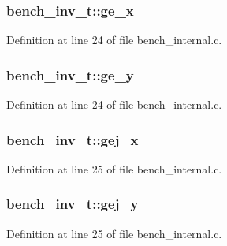 \subsubsection[{ge\+\_\+x}]{ bench\+\_\+inv\+\_\+t\+::ge\+\_\+x}\label{structbench__inv__t_a61098b92fed00ae0f9f28707a9651f1d}


Definition at line 24 of file bench\+\_\+internal.\+c.

\hypertarget{structbench__inv__t_a0ff79efc25c6a6157bfe32eb51e231a3}{}
\subsubsection[{ge\+\_\+y}]{ bench\+\_\+inv\+\_\+t\+::ge\+\_\+y}\label{structbench__inv__t_a0ff79efc25c6a6157bfe32eb51e231a3}


Definition at line 24 of file bench\+\_\+internal.\+c.

\hypertarget{structbench__inv__t_ad800b15a5597e319593b9b5dc216c3e7}{}
\subsubsection[{gej\+\_\+x}]{ bench\+\_\+inv\+\_\+t\+::gej\+\_\+x}\label{structbench__inv__t_ad800b15a5597e319593b9b5dc216c3e7}


Definition at line 25 of file bench\+\_\+internal.\+c.

\hypertarget{structbench__inv__t_a3723df1adf93d090562d8e3c1cf9a6c1}{}
\subsubsection[{gej\+\_\+y}]{ bench\+\_\+inv\+\_\+t\+::gej\+\_\+y}\label{structbench__inv__t_a3723df1adf93d090562d8e3c1cf9a6c1}


Definition at line 25 of file bench\+\_\+internal.\+c.

